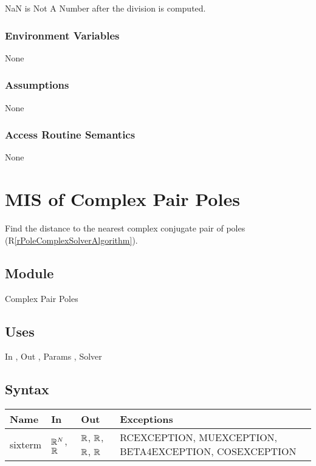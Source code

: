 \documentclass[12pt, titlepage]{article}
\newcommand{\rref}[1]{(R\ref{#1})}
\begin{document}
\Ni NaN is Not A Number after the division is computed.

\subsubsection{Environment Variables}

None

\subsubsection{Assumptions}

None

\subsubsection{Access Routine Semantics}

None


\newpage

\section{MIS of Complex Pair Poles} \label{sc:MIS_POLECOMPLEXSOLVERMODULE}

Find the distance to the nearest complex conjugate pair of poles \rref{rPoleComplexSolverAlgorithm}.

\subsection{Module}

Complex Pair Poles

\subsection{Uses}

In , Out , Params , Solver 

\subsection{Syntax}

\begin{tabular}{p{3cm} p{5cm} p{3cm} >{\raggedright\arraybackslash}p{5cm}}
\toprule
\textbf{Name} & \textbf{In} & \textbf{Out} & \textbf{Exceptions} \\
\midrule
  sixterm & $\mathbb{R}^N$, $\mathbb{R}$ &  $\mathbb{R}$, $\mathbb{R}$, $\mathbb{R}$, $\mathbb{R}$ & {\footnotesize RCEXCEPTION, MUEXCEPTION, BETA4EXCEPTION, COSEXCEPTION} \\
\bottomrule
\end{tabular}
\end{document}
